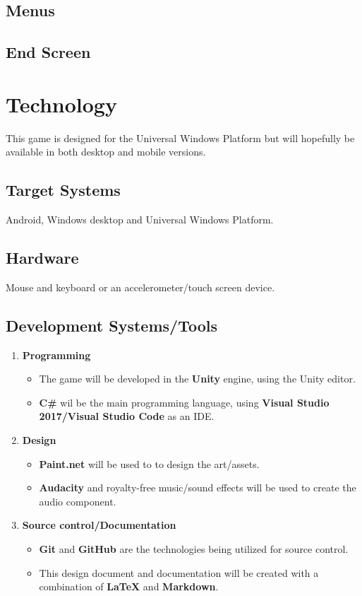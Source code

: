 \documentclass[a4paper]{scrreprt}
\begin{document}
\section{Menus}

\section{End Screen}



\chapter{Technology}
This game is designed for the Universal Windows Platform but will hopefully be available in both desktop and mobile versions.

\section{Target Systems}
Android, Windows desktop and Universal Windows Platform.

\section{Hardware}
Mouse and keyboard or an accelerometer/touch screen device.

\section{Development Systems/Tools}
\begin{enumerate}
  \item \textbf{Programming}
  \begin{itemize}
    \item The game will be developed in the \textbf{Unity} engine, using the Unity editor. 
    \item \textbf{C\#} wil be the main programming language, using \textbf{Visual Studio 2017/Visual Studio Code} as an IDE.
  \end{itemize}
  \item \textbf{Design}
  \begin{itemize}
    \item \textbf{Paint.net} will be used to to design the art/assets.
    \item \textbf{Audacity} and royalty-free music/sound effects will be used to create the audio component.
  \end{itemize}
  \item \textbf{Source control/Documentation}
  \begin{itemize}
    \item \textbf{Git} and \textbf{GitHub} are the technologies being utilized for source control. 
    \item This design document and documentation will be created with a combination of \textbf{LaTeX} and \textbf{Markdown}.
  \end{itemize}

\end{enumerate}
\end{document}
